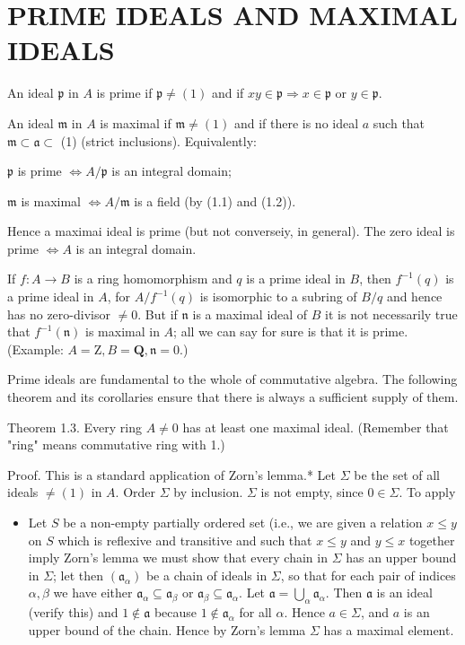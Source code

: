 \documentclass{standalone}
\theoremstyle{definition}
\theoremstyle{remark}
\begin{document}
\section{PRIME IDEALS AND MAXIMAL IDEALS}
An ideal $\mathfrak{p}$ in $A$ is prime if $\mathfrak{p} \neq(1)$ and if $x y \in \mathfrak{p} \Rightarrow x \in \mathfrak{p}$ or $y \in \mathfrak{p}$.

An ideal $\mathfrak{m}$ in $A$ is maximal if $\mathfrak{m} \neq(1)$ and if there is no ideal $a$ such that $\mathfrak{m} \subset \mathfrak{a} \subset$ (1) (strict inclusions). Equivalently:

$\mathfrak{p}$ is prime $\Leftrightarrow A / \mathfrak{p}$ is an integral domain;

$\mathfrak{m}$ is maximal $\Leftrightarrow A / \mathfrak{m}$ is a field (by (1.1) and (1.2)).

Hence a maximai ideal is prime (but not converseiy, in general). The zero ideal is prime $\Leftrightarrow A$ is an integral domain.

If $f: A \rightarrow B$ is a ring homomorphism and $q$ is a prime ideal in $B$, then $f^{-1}(q)$ is a prime ideal in $A$, for $A / f^{-1}(q)$ is isomorphic to a subring of $B / q$ and hence has no zero-divisor $\neq 0$. But if $\mathfrak{n}$ is a maximal ideal of $B$ it is not necessarily true that $f^{-1}(\mathfrak{n})$ is maximal in $A$; all we can say for sure is that it is prime. (Example: $A=\mathrm{Z}, B=\mathbf{Q}, \mathfrak{n}=0$.)

Prime ideals are fundamental to the whole of commutative algebra. The following theorem and its corollaries ensure that there is always a sufficient supply of them.

Theorem 1.3. Every ring $A \neq 0$ has at least one maximal ideal. (Remember that "ring" means commutative ring with 1.)

Proof. This is a standard application of Zorn's lemma.* Let $\Sigma$ be the set of all ideals $\neq(1)$ in $A$. Order $\Sigma$ by inclusion. $\Sigma$ is not empty, since $0 \in \Sigma$. To apply

\begin{itemize}
  \item Let $S$ be a non-empty partially ordered set (i.e., we are given a relation $x \leqslant y$ on $S$ which is reflexive and transitive and such that $x \leqslant y$ and $y \leqslant x$ together imply Zorn's lemma we must show that every chain in $\Sigma$ has an upper bound in $\Sigma$; let then $\left(\mathfrak{a}_{\alpha}\right)$ be a chain of ideals in $\Sigma$, so that for each pair of indices $\alpha, \beta$ we have either $\mathfrak{a}_{\alpha} \subseteq \mathfrak{a}_{\beta}$ or $\mathfrak{a}_{\beta} \subseteq \mathfrak{a}_{\alpha}$. Let $\mathfrak{a}=\bigcup_{\alpha} \mathfrak{a}_{\alpha}$. Then $\mathfrak{a}$ is an ideal (verify this) and $1 \notin \mathfrak{a}$ because $1 \notin \mathfrak{a}_{\alpha}$ for all $\alpha$. Hence $a \in \Sigma$, and $a$ is an upper bound of the chain. Hence by Zorn's lemma $\Sigma$ has a maximal element.
\end{itemize}
\end{document}
